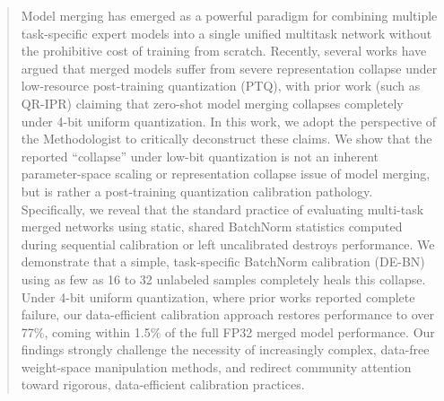 \documentclass{article}
\theoremstyle{plain}
\theoremstyle{definition}
\theoremstyle{remark}
\begin{document}

\makeatletter
\gdef\@icmltitlerunning{Quantization Noise in Model Merging}
\makeatother

\printAffiliationsAndNotice{}

\begin{abstract}
Model merging has emerged as a powerful paradigm for combining multiple task-specific expert models into a single unified multitask network without the prohibitive cost of training from scratch. Recently, several works have argued that merged models suffer from severe representation collapse under low-resource post-training quantization (PTQ), with prior work (such as QR-IPR) claiming that zero-shot model merging collapses completely under 4-bit uniform quantization. In this work, we adopt the perspective of the Methodologist to critically deconstruct these claims. We show that the reported ``collapse'' under low-bit quantization is not an inherent parameter-space scaling or representation collapse issue of model merging, but is rather a post-training quantization calibration pathology. Specifically, we reveal that the standard practice of evaluating multi-task merged networks using static, shared BatchNorm statistics computed during sequential calibration or left uncalibrated destroys performance. We demonstrate that a simple, task-specific BatchNorm calibration (DE-BN) using as few as 16 to 32 unlabeled samples completely heals this collapse. Under 4-bit uniform quantization, where prior works reported complete failure, our data-efficient calibration approach restores performance to over 77\%, coming within 1.5\% of the full FP32 merged model performance. Our findings strongly challenge the necessity of increasingly complex, data-free weight-space manipulation methods, and redirect community attention toward rigorous, data-efficient calibration practices.
\end{abstract}
\end{document}
